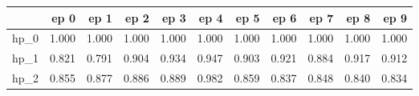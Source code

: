 \begin{tabular}{lrrrrrrrrrr}
\toprule
{} &   ep 0 &   ep 1 &   ep 2 &   ep 3 &   ep 4 &   ep 5 &   ep 6 &   ep 7 &   ep 8 &   ep 9 \\
\midrule
hp\_0 &  1.000 &  1.000 &  1.000 &  1.000 &  1.000 &  1.000 &  1.000 &  1.000 &  1.000 &  1.000 \\
hp\_1 &  0.821 &  0.791 &  0.904 &  0.934 &  0.947 &  0.903 &  0.921 &  0.884 &  0.917 &  0.912 \\
hp\_2 &  0.855 &  0.877 &  0.886 &  0.889 &  0.982 &  0.859 &  0.837 &  0.848 &  0.840 &  0.834 \\
\bottomrule
\end{tabular}
